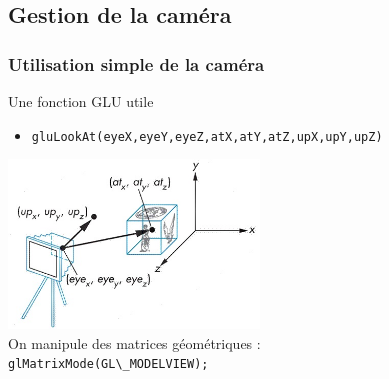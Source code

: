 \documentclass{beamer}
\begin{document}

\subsection{Gestion de la caméra}

\begin{frame}
\frametitle{Utilisation simple de la caméra}
\begin{block}{Une fonction GLU utile}
	\begin{itemize}
		\item{\verb!gluLookAt(eyeX,eyeY,eyeZ,atX,atY,atZ,upX,upY,upZ)!
		}
	\end{itemize}
	\centering
	\includegraphics[width=0.5\textwidth]{img/ortho}\\
	On manipule des matrices géométriques :\\
	\verb!glMatrixMode(GL\_MODELVIEW);!
\end{block}
\end{frame}
\end{document}
